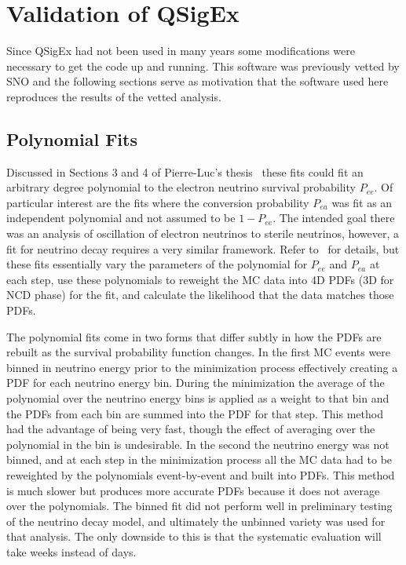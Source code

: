 \chapter{Validation of QSigEx}
\label{qsigex_validation}

Since QSigEx had not been used in many years some modifications were necessary to get the code up and running. 
This software was previously vetted by SNO and the following sections serve as motivation that the software used here reproduces the results of the vetted analysis.

\section{Polynomial Fits}

Discussed in Sections 3 and 4 of Pierre-Luc's thesis~\cite{plthesis} these fits could fit an arbitrary degree polynomial to the electron neutrino survival probability $P_{ee}$. 
Of particular interest are the fits where the conversion probability $P_{ea}$ was fit as an independent polynomial and not assumed to be $1-P_{ee}$. 
The intended goal there was an analysis of oscillation of electron neutrinos to sterile neutrinos, however, a fit for neutrino decay requires a very similar framework.
Refer to~\cite{plthesis} for details, but these fits essentially vary the parameters of the polynomial for $P_{ee}$ and $P_{ea}$ at each step, use these polynomials to reweight the MC data into 4D PDFs (3D for NCD phase) for the fit, and calculate the likelihood that the data matches those PDFs. 

The polynomial fits come in two forms that differ subtly in how the PDFs are rebuilt as the survival probability function changes.
In the first MC events were binned in neutrino energy prior to the minimization process effectively creating a PDF for each neutrino energy bin. 
During the minimization the average of the polynomial over the neutrino energy bins is applied as a weight to that bin and the PDFs from each bin are summed into the PDF for that step.
This method had the advantage of being very fast, though the effect of averaging over the polynomial in the bin is undesirable.
In the second the neutrino energy was not binned, and at each step in the minimization process all the MC data had to be reweighted by the polynomials event-by-event and built into PDFs. 
This method is much slower but produces more accurate PDFs because it does not average over the polynomials.
The binned fit did not perform well in preliminary testing of the neutrino decay model, and ultimately the unbinned variety was used for that analysis.
The only downside to this is that the systematic evaluation will take weeks instead of days.


